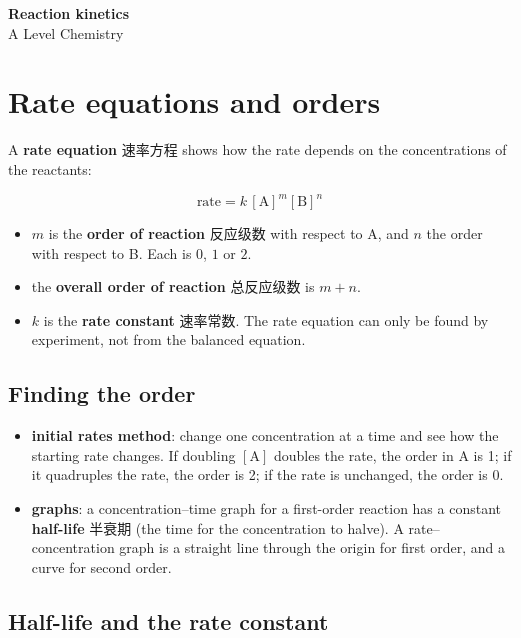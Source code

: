 \documentclass[11pt]{article}
\begin{document}
\begin{center}
  {\LARGE\bfseries Reaction kinetics}\\[0.35em]
  {\large A Level Chemistry}
\end{center}
\vspace{0.6em}

\section*{Rate equations and orders}

A \textbf{rate equation} 速率方程 shows how the rate depends on the concentrations of the reactants:

\[
\text{rate} = k\,[\text{A}]^m[\text{B}]^n
\]

\begin{itemize}
\item $m$ is the \textbf{order of reaction} 反应级数 with respect to A, and $n$ the order with respect to B. Each is $0$, $1$ or $2$.

\item the \textbf{overall order of reaction} 总反应级数 is $m + n$.

\item $k$ is the \textbf{rate constant} 速率常数. The rate equation can only be found by experiment, not from the balanced equation.

\end{itemize}

\subsection*{Finding the order}

\begin{itemize}
\item \textbf{initial rates method}: change one concentration at a time and see how the starting rate changes. If doubling $[\text{A}]$ doubles the rate, the order in A is 1; if it quadruples the rate, the order is 2; if the rate is unchanged, the order is 0.

\item \textbf{graphs}: a concentration–time graph for a first-order reaction has a constant \textbf{half-life} 半衰期 (the time for the concentration to halve). A rate–concentration graph is a straight line through the origin for first order, and a curve for second order.

\end{itemize}

\subsection*{Half-life and the rate constant}
\end{document}

